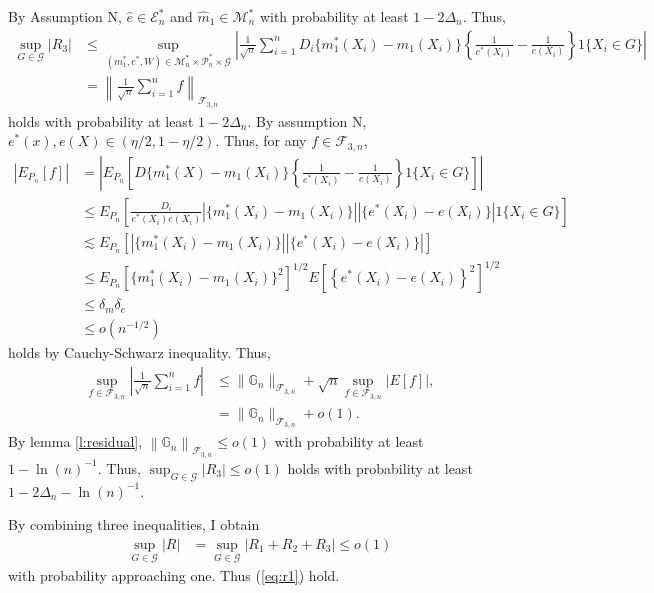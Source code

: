 \documentclass[12pt,oneside,reqno,english]{amsart}
\theoremstyle{definition}
\begin{document}
By Assumption N, 
$\hat{e}\in \mathcal{E}^{*}_{n}$ and $\hat{m}_{1}\in \mathcal{M}^{*}_{n}$
with probability at least $1-2\Delta_{n}$. Thus, 
\begin{align*}
\sup_{G\in \mathcal{G}}|R_{3}| &\leq \sup_{(m_{1}^{*},e^{*},W)\in\mathcal{M}^{*}_{n}\times \mathcal{P}^{*}_{n}\times \mathcal{G}}\left|
\frac{1}{\sqrt{n}}\sum_{i=1}^{n}D_{i}\{m_{1}^{*}(X_{i})-m_{1}(X_{i})\}\left\{\frac{1}{e^{*}(X_{i})}-\frac{1}{e(X_{i})}\right\}1\{X_{i}\in G\}\right|\\
&=\left\|\frac{1}{\sqrt{n}}\sum_{i=1}^{n}f\right\|_{\mathcal{F}_{3,n}}
\end{align*}
holds with probability at least $1-2\Delta_{n}$.
By assumption N, $e^{*}(x),e(X)\in (\eta/2,1-\eta/2)$. Thus, for any $f\in \mathcal{F}_{3,n}$, 
\begin{align*}
|E_{P_{n}}[f]|&=\left|E_{P_{n}}\left[D\{m_{1}^{*}(X)-m_{1}(X_{i})\}\left\{\frac{1}{e^{*}(X_{i})}-\frac{1}{e(X_{i})}\right\}1\{X_{i}\in G\}\right]\right|\\
&\leq E_{P_{n}}\left[\frac{D_{i}}{e^{*}(X_{i})e(X_{i})}\left|\{m_{1}^{*}(X_{i})-m_{1}(X_{i})\}\right|\left| \{e^{*}(X_{i})-e(X_{i})\}\right|1\{X_{i}\in G\}\right]\\
&\lesssim E_{P_{n}}\left[\left|\{m_{1}^{*}(X_{i})-m_{1}(X_{i})\}\right| \left|\{e^{*}(X_{i})-e(X_{i})\}\right|\right]\\
&\leq E_{P_{n}}[\{m_{1}^{*}(X_{i})-m_{1}(X_{i})\}^{2}]^{1/2}E[\left\{e^{*}(X_{i})-e(X_{i})\right\}^{2}]^{1/2}\\
&\leq \delta_{m}\delta_{e}\\
&\leq o(n^{-1/2})
\end{align*}
holds by Cauchy-Schwarz inequality.
Thus,   
\begin{align*}
\sup_{f\in \mathcal{F}_{3,n}}\left|\frac{1}{\sqrt{n}}\sum_{i=1}^{n}f\right|&\leq \|\mathbb{G}_{n}\|_{\mathcal{F}_{3,n}}+\sqrt{n}\sup_{f\in \mathcal{F}_{3,n}}|E[f]|,\\
&=\|\mathbb{G}_{n}\|_{\mathcal{F}_{3,n}}+o(1).
\end{align*}
By lemma \ref{l:residual}, 
$\left\|\mathbb{G}_{n}\right\|_{\mathcal{F}_{3,n}}\leq o(1)$
with probability at least $1-\ln(n)^{-1}$. Thus,  
$\sup_{G\in \mathcal{G}}|R_{3}|\leq o(1)$ holds with probability at least $1-2\Delta_{n}-\ln(n)^{-1}$. 


By combining three inequalities, I obtain   
\begin{align*}
\sup_{G\in \mathcal{G}}|R|&=\sup_{G\in \mathcal{G}}|R_{1}+R_{2}+R_{3}|\leq o(1)
\end{align*}
with probability approaching one. Thus (\ref{eq:r1}) hold. 
\end{document}
